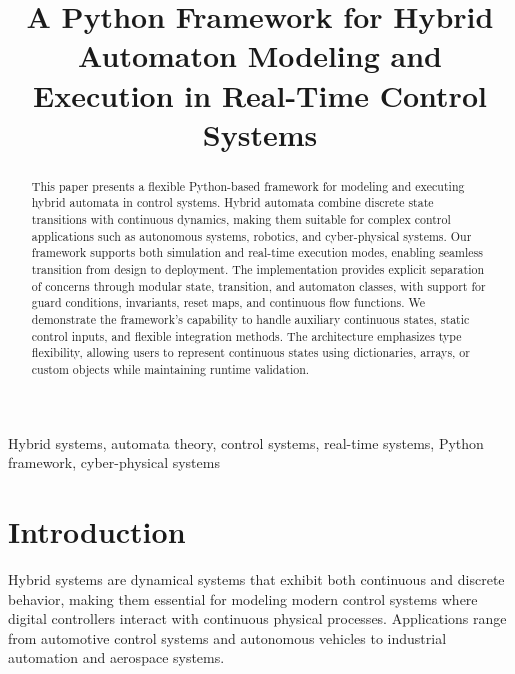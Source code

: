 \documentclass[conference]{IEEEtran}
\begin{document}
\title{A Python Framework for Hybrid Automaton Modeling and Execution in Real-Time Control Systems}

\author{
}

\maketitle

\begin{abstract}
This paper presents a flexible Python-based framework for modeling and executing hybrid automata in control systems. Hybrid automata combine discrete state transitions with continuous dynamics, making them suitable for complex control applications such as autonomous systems, robotics, and cyber-physical systems. Our framework supports both simulation and real-time execution modes, enabling seamless transition from design to deployment. The implementation provides explicit separation of concerns through modular state, transition, and automaton classes, with support for guard conditions, invariants, reset maps, and continuous flow functions. We demonstrate the framework's capability to handle auxiliary continuous states, static control inputs, and flexible integration methods. The architecture emphasizes type flexibility, allowing users to represent continuous states using dictionaries, arrays, or custom objects while maintaining runtime validation.
\end{abstract}

\begin{IEEEkeywords}
Hybrid systems, automata theory, control systems, real-time systems, Python framework, cyber-physical systems
\end{IEEEkeywords}

\section{Introduction}

Hybrid systems are dynamical systems that exhibit both continuous and discrete behavior, making them essential for modeling modern control systems where digital controllers interact with continuous physical processes. Applications range from automotive control systems and autonomous vehicles to industrial automation and aerospace systems.
\end{document}
